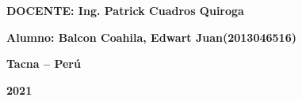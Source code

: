\documentclass{article}
\begin{document}
\begin{titlepage}
\begin{center}
\vspace*{0.3in}
\begin{Large}
\textbf{DOCENTE: Ing. Patrick Cuadros Quiroga} \\
\end{Large}

\vspace*{0.2in}
\vspace*{0.1in}
\begin{large}

\begin{Large}
\textbf{Alumno: Balcon Coahila, Edwart Juan\hfill	(2013046516) } \\
\end{Large}

\vspace*{0.15in}
\begin{Large}
\textbf{Tacna – Perú} \\
\end{Large}

\vspace*{0.05in}
\begin{Large}
\textbf{2021 } \\
\end{Large}

\end{large}
\end{center}

\end{titlepage}


\newpage
\end{document}
